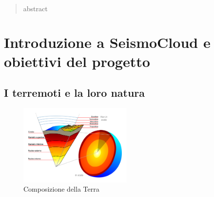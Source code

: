 \documentclass[a4paper,10pt]{memoir}
\begin{document}
\frontmatter


\maketitle
\cleardoublepage


\begin{abstract}
  abstract
\end{abstract}
\cleardoublepage

\tableofcontents
\cleardoublepage

\mainmatter

\renewcommand\chapterheadstart{}
\renewcommand\printchaptername{}
\renewcommand\chapternamenum{}
\renewcommand\printchapternum{}
\renewcommand\afterchapternum{}
\renewcommand\printchaptertitle[1]{\chaptitlefont \thechapter. \space #1}


\chapter{Introduzione a SeismoCloud e obiettivi del progetto}

\section{I terremoti e la loro natura}

\begin{figure}
\caption{Composizione della Terra}
\label{fig:crostaterrestre}
\includegraphics[width=0.50\textwidth]{Chapter-1/crosta-terrestre.png}
\end{figure}
\end{document}
